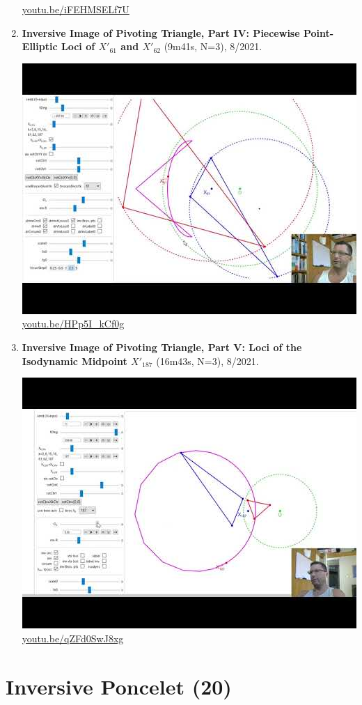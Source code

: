 \documentclass[12pt]{amsart}
\begin{document}
\begin{enumerate}[resume]
\begin{center}
\href{https://youtu.be/iFEHMSELf7U}{\url{youtu.be/iFEHMSELf7U}}\end{center}
% 
\item \textbf{Inversive Image of Pivoting Triangle, Part IV: Piecewise Point-Elliptic Loci of $X'_{61}$ and $X'_{62}$} (9m41s, N=3), 8/2021. 
\begin{center}\includegraphics[width=.5\textwidth]{pics/HPp5I_kCf0g.jpg} \\ 
\href{https://youtu.be/HPp5I_kCf0g}{\url{youtu.be/HPp5I\_kCf0g}}\end{center}
% 
\item \textbf{Inversive Image of Pivoting Triangle, Part V: Loci of the Isodynamic Midpoint $X'_{187}$} (16m43s, N=3), 8/2021. 
\begin{center}\includegraphics[width=.5\textwidth]{pics/qZFd0SwJ8xg.jpg} \\ 
\href{https://youtu.be/qZFd0SwJ8xg}{\url{youtu.be/qZFd0SwJ8xg}}\end{center}
% 
\end{enumerate}

\section{Inversive Poncelet (20)}
\end{document}
